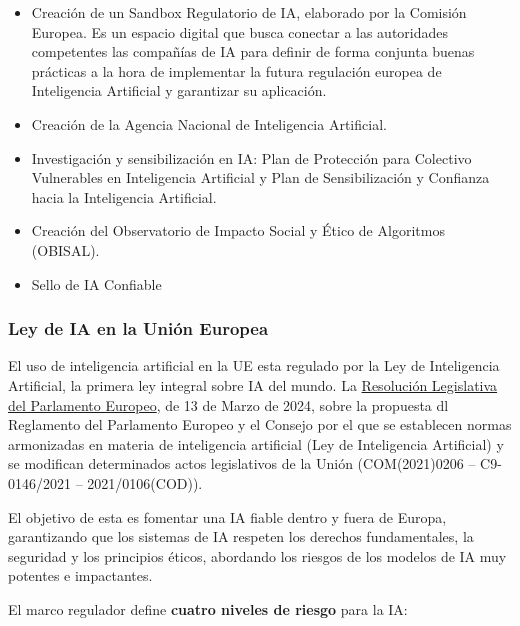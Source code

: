 \begin{itemize}
	\begin{itemize}
		\item Creación de un Sandbox Regulatorio de IA, elaborado por la Comisión Europea. Es un espacio digital que busca conectar a las autoridades competentes las compañías de IA para definir de forma conjunta buenas prácticas a la hora de implementar la futura regulación europea de Inteligencia Artificial y garantizar su aplicación.
		\item Creación de la Agencia Nacional de Inteligencia Artificial.
		\item Investigación y sensibilización en IA: Plan de Protección para Colectivo Vulnerables en Inteligencia Artificial y Plan de Sensibilización y Confianza hacia la Inteligencia Artificial. 
		\item Creación del Observatorio de Impacto Social y Ético de Algoritmos (OBISAL).
		\item Sello de IA Confiable
	\end{itemize}
\end{itemize}

\subsubsection{Ley de IA en la Unión Europea}
El uso de inteligencia artificial en la UE esta regulado por la Ley de Inteligencia Artificial, la primera ley integral sobre IA del mundo. La \href{https://artificialintelligenceact.eu/es/}{Resolución Legislativa del Parlamento Europeo}, de 13 de Marzo de 2024, sobre la propuesta dl Reglamento del Parlamento Europeo y el Consejo por el que se establecen normas armonizadas en materia de inteligencia artificial (Ley de Inteligencia Artificial) y se modifican determinados actos legislativos de la Unión (COM(2021)0206 – C9-0146/2021 – 2021/0106(COD)).

El objetivo de esta es fomentar una IA fiable dentro y fuera de Europa, garantizando que los sistemas de IA respeten los derechos fundamentales, la seguridad y los principios éticos, abordando los riesgos de los modelos de IA muy potentes e impactantes.

El marco regulador define \textbf{cuatro niveles de riesgo} para la IA:

